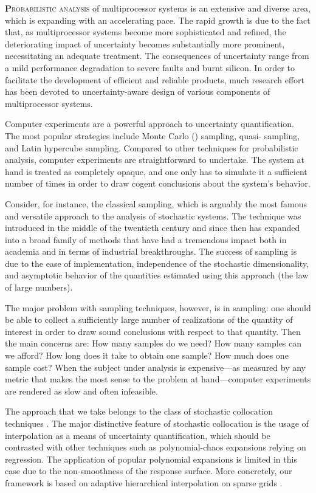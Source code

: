 \lettrine[findent=0.4em, nindent=0em]{\textbf{P}}{robabilistic analysis} of
multiprocessor systems is an extensive and diverse area, which is expanding with
an accelerating pace. The rapid growth is due to the fact that, as
multiprocessor systems become more sophisticated and refined, the deteriorating
impact of uncertainty becomes substantially more prominent, necessitating an
adequate treatment. The consequences of uncertainty range from a mild
performance degradation to severe faults and burnt silicon. In order to
facilitate the development of efficient and reliable products, much research
effort has been devoted to uncertainty-aware design of various components of
multiprocessor systems.

Computer experiments \cite{santner2003} are a powerful approach to uncertainty
quantification. The most popular strategies include Monte Carlo ()
sampling, quasi- sampling, and Latin hypercube sampling. Compared to
other techniques for probabilistic analysis, computer experiments are
straightforward to undertake. The system at hand is treated as completely
opaque, and one only has to simulate it a sufficient number of times in order to
draw cogent conclusions about the system's behavior.

Consider, for instance, the classical  sampling, which is arguably the
most famous and versatile approach to the analysis of stochastic systems. The
technique was introduced in the middle of the twentieth century and since then
has expanded into a broad family of methods that have had a tremendous impact
both in academia and in terms of industrial breakthroughs. The success of
 sampling is due to the ease of implementation, independence of the
stochastic dimensionality, and asymptotic behavior of the quantities estimated
using this approach (the law of large numbers).

The major problem with sampling techniques, however, is in sampling: one should
be able to collect a sufficiently large number of realizations of the quantity
of interest in order to draw sound conclusions with respect to that quantity.
Then the main concerns are: How many samples do we need? How many samples can we
afford? How long does it take to obtain one sample? How much does one sample
cost? When the subject under analysis is expensive---as measured by any metric
that makes the most sense to the problem at hand---computer experiments are
rendered as slow and often infeasible.

The approach that we take belongs to the class of stochastic collocation
techniques \cite{xiu2010}. The major distinctive feature of stochastic
collocation is the usage of interpolation as a means of uncertainty
quantification, which should be contrasted with other techniques such as
polynomial-chaos expansions relying on regression. The application of popular
polynomial expansions is limited in this case due to the non-smoothness of the
response surface. More concretely, our framework is based on adaptive
hierarchical interpolation on sparse grids \cite{klimke2006, ma2009}.

